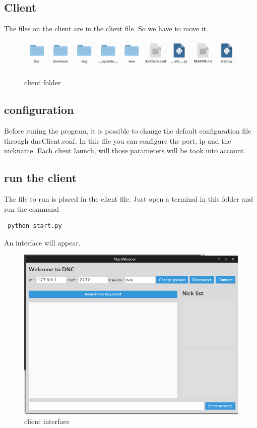 \documentclass[12pt]{article}
\begin{document}
\begin{flushleft}
    \section{Client}
The files on the client are in the client file. So we have to move it.

\begin{figure}
    \includegraphics[scale=0.4]{client.png}
    \caption{client folder}
\end{figure}
    
    \subsection{configuration}
Before runing the program, it is possible to change the default configuration file through dncClient.conf. In this file you can configure the port, ip and the nickname. Each client launch, will those parameters will be took into account.

    \subsection{run the client}
The file to run is placed in the client file. Just open a terminal in this folder and run the command
\begin{lstlisting}
 python start.py

 \end{lstlisting} 
  An interface will appear. 
  
  \begin{figure}
    \includegraphics[scale=0.5]{progClient.png}
    \caption{client interface}
\end{figure} 
     

\end{flushleft}
\end{document}
